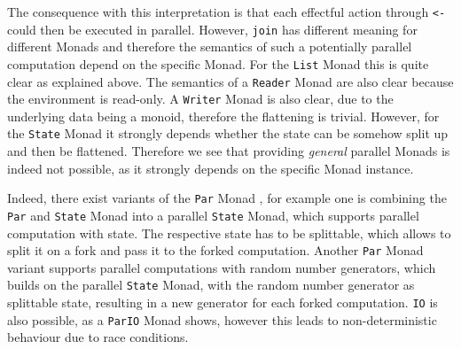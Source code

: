The consequence with this interpretation is that each effectful action through \texttt{<-} could then be executed in parallel. However, \texttt{join} has different meaning for different Monads and therefore the semantics of such a potentially parallel computation depend on the specific Monad. For the \texttt{List} Monad this is quite clear as explained above. The semantics of a \texttt{Reader} Monad are also clear because the environment is read-only. A \texttt{Writer} Monad is also clear, due to the underlying data being a monoid, therefore the flattening is trivial. However, for the \texttt{State} Monad it strongly depends whether the state can be somehow split up and then be flattened. Therefore we see that providing \textit{general} parallel Monads is indeed not possible, as it strongly depends on the specific Monad instance.

Indeed, there exist variants of the \texttt{Par} Monad \cite{par_extras_hackage}, for example one is combining the \texttt{Par} and \texttt{State} Monad into a parallel \texttt{State} Monad, which supports parallel computation with state. The respective state has to be splittable, which allows to split it on a fork and pass it to the forked computation. Another \texttt{Par} Monad variant supports parallel computations with random number generators, which builds on the parallel \texttt{State} Monad, with the random number generator as splittable state, resulting in a new generator for each forked computation. \texttt{IO} is also possible, as a \texttt{ParIO} Monad shows, however this leads to non-deterministic behaviour due to race conditions.
